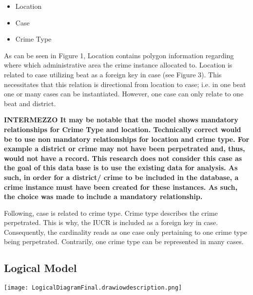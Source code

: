 \documentclass[a4paper]{article}
\begin{document}
\begin{itemize}
  \item Location
  \item Case
  \item Crime Type
\end{itemize}

\indent As can be seen in Figure 1, Location contains polygon information regarding where which administrative area the crime instance allocated to. Location is related to case utilizing beat as a foreign key in case (see Figure 3). This necessitates that this relation is directional from location to case; i.e. in one beat one or many cases can be instantiated. However, one case can only relate to one beat and district.

\textbf{INTERMEZZO It may be notable that the model shows mandatory relationships for Crime Type and location. Technically correct would be to use non mandatory relationships for location and crime type. For example a district or crime may not have been perpetrated and, thus, would not have a record. This research does not consider this case as the goal of this data base is to use the existing data for analysis. As such, in order for a district/ crime to be included in the database, a crime instance must have been created for these instances. As such, the choice was made to include a mandatory relationship.}

Following, case is related to crime type. Crime type describes the crime perpetrated. This is why, the IUCR is included as a foreign key in case. Consequently, the cardinality reads as one case only pertaining to one crime type being perpetrated. Contrarily, one crime type can be represented in many cases.

\subsection{Logical Model}
\texttt{[image: LogicalDiagramFinal.drawiowdescription.png]}
\end{document}
